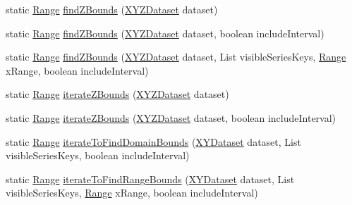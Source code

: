 \begin{DoxyCompactItemize}
\item 
static \mbox{\hyperlink{classorg_1_1jfree_1_1data_1_1_range}{Range}} \mbox{\hyperlink{classorg_1_1jfree_1_1data_1_1general_1_1_dataset_utilities_ae703aaa31501be39373bf778c0f1f559}{find\+Z\+Bounds}} (\mbox{\hyperlink{interfaceorg_1_1jfree_1_1data_1_1xy_1_1_x_y_z_dataset}{X\+Y\+Z\+Dataset}} dataset)
\item 
static \mbox{\hyperlink{classorg_1_1jfree_1_1data_1_1_range}{Range}} \mbox{\hyperlink{classorg_1_1jfree_1_1data_1_1general_1_1_dataset_utilities_a4fc28f4d39c8859fa041ba4af0f33137}{find\+Z\+Bounds}} (\mbox{\hyperlink{interfaceorg_1_1jfree_1_1data_1_1xy_1_1_x_y_z_dataset}{X\+Y\+Z\+Dataset}} dataset, boolean include\+Interval)
\item 
static \mbox{\hyperlink{classorg_1_1jfree_1_1data_1_1_range}{Range}} \mbox{\hyperlink{classorg_1_1jfree_1_1data_1_1general_1_1_dataset_utilities_afa93d889086fc83c3fc9c32546486ea0}{find\+Z\+Bounds}} (\mbox{\hyperlink{interfaceorg_1_1jfree_1_1data_1_1xy_1_1_x_y_z_dataset}{X\+Y\+Z\+Dataset}} dataset, List visible\+Series\+Keys, \mbox{\hyperlink{classorg_1_1jfree_1_1data_1_1_range}{Range}} x\+Range, boolean include\+Interval)
\item 
static \mbox{\hyperlink{classorg_1_1jfree_1_1data_1_1_range}{Range}} \mbox{\hyperlink{classorg_1_1jfree_1_1data_1_1general_1_1_dataset_utilities_afc53b5eeb2011b0143aa6b8692de5b37}{iterate\+Z\+Bounds}} (\mbox{\hyperlink{interfaceorg_1_1jfree_1_1data_1_1xy_1_1_x_y_z_dataset}{X\+Y\+Z\+Dataset}} dataset)
\item 
static \mbox{\hyperlink{classorg_1_1jfree_1_1data_1_1_range}{Range}} \mbox{\hyperlink{classorg_1_1jfree_1_1data_1_1general_1_1_dataset_utilities_abc537e31840e9ad3bafe9e8143939f90}{iterate\+Z\+Bounds}} (\mbox{\hyperlink{interfaceorg_1_1jfree_1_1data_1_1xy_1_1_x_y_z_dataset}{X\+Y\+Z\+Dataset}} dataset, boolean include\+Interval)
\item 
static \mbox{\hyperlink{classorg_1_1jfree_1_1data_1_1_range}{Range}} \mbox{\hyperlink{classorg_1_1jfree_1_1data_1_1general_1_1_dataset_utilities_a3293480f534c2444345c1cf3bb6b6640}{iterate\+To\+Find\+Domain\+Bounds}} (\mbox{\hyperlink{interfaceorg_1_1jfree_1_1data_1_1xy_1_1_x_y_dataset}{X\+Y\+Dataset}} dataset, List visible\+Series\+Keys, boolean include\+Interval)
\item 
static \mbox{\hyperlink{classorg_1_1jfree_1_1data_1_1_range}{Range}} \mbox{\hyperlink{classorg_1_1jfree_1_1data_1_1general_1_1_dataset_utilities_a8d482740f1cd688562362d1be700ec65}{iterate\+To\+Find\+Range\+Bounds}} (\mbox{\hyperlink{interfaceorg_1_1jfree_1_1data_1_1xy_1_1_x_y_dataset}{X\+Y\+Dataset}} dataset, List visible\+Series\+Keys, \mbox{\hyperlink{classorg_1_1jfree_1_1data_1_1_range}{Range}} x\+Range, boolean include\+Interval)

\end{DoxyCompactItemize}
